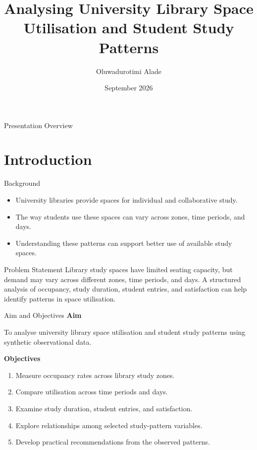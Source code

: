 \documentclass[aspectratio=169,11pt]{beamer}
\title{Analysing University Library Space Utilisation and Student Study Patterns}
\author{Oluwadurotimi Alade}
\institute{University of Ibadan}
\date{September 2026}
\begin{document}
\begin{frame}
    \titlepage
\end{frame}

\begin{frame}{Presentation Overview}
    \tableofcontents
\end{frame}

\section{Introduction}

\begin{frame}{Background}
    \begin{itemize}
        \item University libraries provide spaces for individual and collaborative study.
        \item The way students use these spaces can vary across zones, time periods, and days.
        \item Understanding these patterns can support better use of available study spaces.
    \end{itemize}
\end{frame}

\begin{frame}{Problem Statement}
    Library study spaces have limited seating capacity, but demand may vary
    across different zones, time periods, and days. A structured analysis of
    occupancy, study duration, student entries, and satisfaction can help
    identify patterns in space utilisation.
\end{frame}

\begin{frame}{Aim and Objectives}
    \textbf{Aim}

    To analyse university library space utilisation and student study patterns
    using synthetic observational data.

    \vspace{0.4cm}

    \textbf{Objectives}
    \begin{enumerate}
        \item Measure occupancy rates across library study zones.
        \item Compare utilisation across time periods and days.
        \item Examine study duration, student entries, and satisfaction.
        \item Explore relationships among selected study-pattern variables.
        \item Develop practical recommendations from the observed patterns.
    \end{enumerate}
\end{frame}
\end{document}
